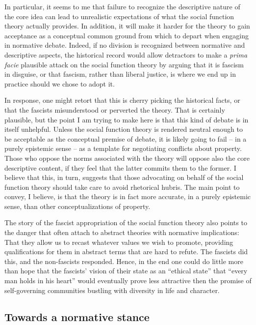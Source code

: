 In particular, it seems to me that failure to recognize the descriptive nature of the core idea can lead to unrealistic expectations of what the social function theory actually provides. In addition, it will make it harder for the theory to gain acceptance as a conceptual common ground from which to depart when engaging in normative debate. Indeed, if no division is recognized between normative and descriptive aspects, the historical record would allow detractors to make a {\it prima facie} plausible attack on the social function theory by arguing that it is fascism in disguise, or that fascism, rather than liberal justice, is where we end up in practice should we chose to adopt it. 

In response, one might retort that this is cherry picking the historical facts, or that the fascists misunderstood or perverted the theory. That is certainly plausible, but the point I am trying to make here is that this kind of debate is in itself unhelpful. Unless the social function theory is rendered neutral enough to be acceptable as the conceptual premise of debate, it is likely going to fail -- in a purely epistemic sense -- as a template for negotiating conflicts about property. Those who oppose the norms associated with the theory will oppose also the core descriptive content, if they feel that the latter commits them to the former. I believe that this, in turn, suggests that those advocating on behalf of the social function theory should take care to avoid rhetorical hubris. The main point to convey, I believe, is that the theory is in fact more accurate, in a purely epistemic sense, than other conceptualizations of property.

The story of the fascist appropriation of the social function theory also points to the danger that often attach to abstract theories with normative implications: That they allow us to recast whatever values we wish to promote, providing qualifications for them in abstract terms that are hard to refute. The fascists did this, and the non-fascists responded. Hence, in the end one could do little more than hope that the fascists' vision of their state as an ``ethical state'' that ``every man holds in his heart'' would eventually prove less attractive then the promise of self-governing communities bustling with diversity in life and character.

\subsection{Towards a normative stance}

